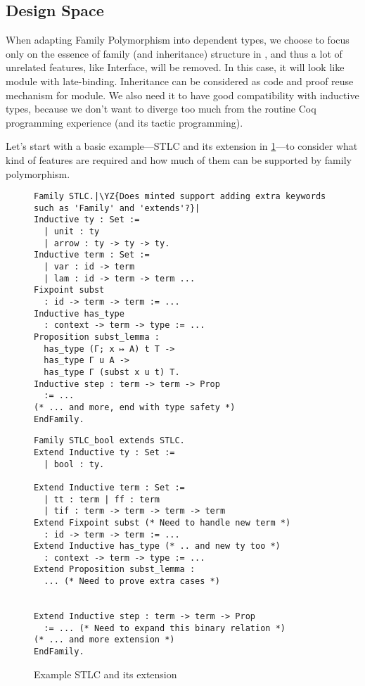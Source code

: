 \subsection{Design Space}

When adapting Family Polymorphism into dependent types, we choose to
focus only on the essence of family (and inheritance)
structure in \citet{zm2017}, and thus a lot of unrelated features, like
Interface, will be removed. In this case, it will look like module with
late-binding. Inheritance can be considered as code and proof reuse mechanism for module. We also
need it to have good compatibility with inductive types, because we
don't want to diverge too much from the routine Coq programming experience
(and its tactic programming). 

Let's start with a basic example---STLC and its extension in
\cref{fig:STLC-example}---to consider what kind of features are required
and how much of them can be supported by family polymorphism.

\begin{figure}[!htb]
  \begin{minipage}[t]{0.47\linewidth}
\begin{verbatim}
Family STLC.|\YZ{Does minted support adding extra keywords such as 'Family' and 'extends'?}|
Inductive ty : Set :=
  | unit : ty
  | arrow : ty -> ty -> ty.
Inductive term : Set := 
  | var : id -> term 
  | lam : id -> term -> term ...
Fixpoint subst 
  : id -> term -> term := ...
Inductive has_type 
  : context -> term -> type := ...
Proposition subst_lemma :
  has_type (Γ; x ↦ A) t T ->
  has_type Γ u A ->
  has_type Γ (subst x u t) T.
Inductive step : term -> term -> Prop 
  := ...
(* ... and more, end with type safety *)
EndFamily.
\end{verbatim}
  \end{minipage}
  \begin{minipage}[t]{0.47\linewidth}
\begin{verbatim}
Family STLC_bool extends STLC.
Extend Inductive ty : Set :=
  | bool : ty.

Extend Inductive term : Set := 
  | tt : term | ff : term 
  | tif : term -> term -> term -> term
Extend Fixpoint subst (* Need to handle new term *)
  : id -> term -> term := ...
Extend Inductive has_type (* .. and new ty too *)
  : context -> term -> type := ...
Extend Proposition subst_lemma :
  ... (* Need to prove extra cases *)


Extend Inductive step : term -> term -> Prop 
  := ... (* Need to expand this binary relation *)
(* ... and more extension *)
EndFamily.
\end{verbatim}
  \end{minipage}
  \caption{Example STLC and its extension}\label{fig:STLC-example}
\end{figure}



